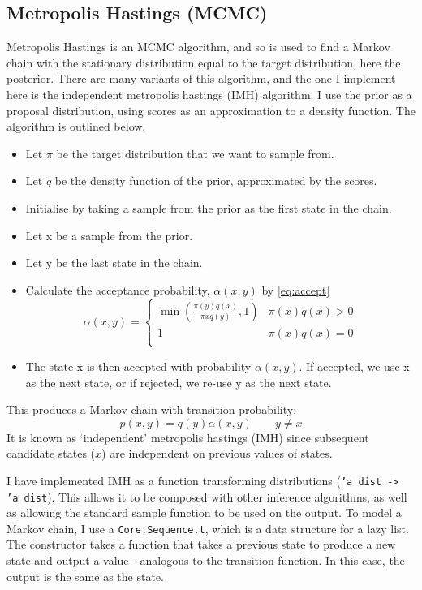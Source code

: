 \subsection{Metropolis Hastings (MCMC)} \label{sec:mh}
Metropolis Hastings is an MCMC algorithm, and so is used to find a Markov chain with the stationary distribution equal to the target distribution, here the posterior. There are many variants of this algorithm, and the one I implement here is the independent metropolis hastings (IMH) algorithm. I use the prior as a proposal distribution, using scores as an approximation to a density function. The algorithm is outlined below.
\begin{itemize}
	\item Let $\pi$ be the target distribution that we want to sample from.
	\item Let $q$ be the density function of the prior, approximated by the scores.
	\item Initialise by taking a sample from the prior as the first state in the chain.
	\item Let x be a sample from the prior.
	\item Let y be the last state in the chain.
	\item Calculate the acceptance probability, $\alpha(x,y)$ by \eqref{eq:accept}
	      \begin{equation}
	      	\label{eq:accept}
	      	\alpha(x,y) = 
	      	\begin{cases}
	      		\min{\left( \frac{\pi(y)q(x)}{\pi{x}q(y)},1 \right) } & \pi(x)q(x) > 0 \\
	      		1                                                     & \pi(x)q(x) = 0 \\
	      	\end{cases}
	      \end{equation}	      	      	      	      
	\item The state x is then accepted with probability $\alpha(x,y)$. If accepted, we use x as the next state, or if rejected, we re-use y as the next state. 
\end{itemize}
	
This produces a Markov chain with transition probability: \[p(x, y) = q(y)\alpha(x, y) \quad\quad y\neq x\]
It is known as `independent' metropolis hastings (IMH) since subsequent candidate states ($x$) are independent on previous values of states.
	
I have implemented IMH as a function transforming distributions (\texttt{'a dist -> 'a dist}). This allows it to be composed with other inference algorithms, as well as allowing the standard sample function to be used on the output. To model a Markov chain, I use a \texttt{Core.Sequence.t}, which is a data structure for a lazy list. The constructor takes a function that takes a previous state to produce a new state and output a value - analogous to the transition function. In this case, the output is the same as the state.
	
